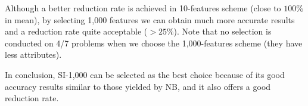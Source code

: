 \documentclass[preprint,12pt]{elsarticle}
\begin{document}
Although a better reduction rate is achieved in 10-features scheme (close to $100\%$ in mean), by selecting 1,000 features we can obtain much more accurate results and a reduction rate quite acceptable ($> 25\%$). Note that no selection is conducted on 4/7 problems when we choose the 1,000-features scheme (they have less attributes).

In conclusion, SI-1,000 can be selected as the best choice because of its good accuracy  results similar to those yielded by NB, and it also offers a good reduction rate.


\end{document}
